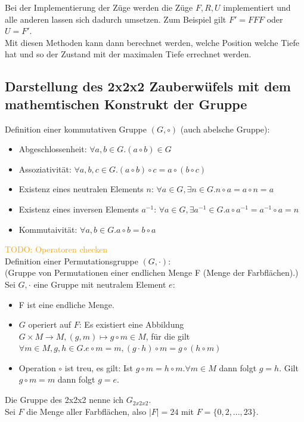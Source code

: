 \documentclass[12pt,a4paper, usenames, dvipsnames]{scrartcl}
\begin{document}
Bei der Implementierung der Züge werden die Züge $F, R, U$ implementiert und alle anderen lassen sich dadurch umsetzen. Zum Beispiel gilt $F' = FFF$ oder $U=F'$. \\
Mit diesen Methoden kann dann berechnet werden, welche Position welche Tiefe hat und so der Zustand mit der maximalen Tiefe errechnet werden.


\newpage 
\subsection*{Darstellung des 2x2x2 Zauberwüfels mit dem mathemtischen Konstrukt der Gruppe}
Definition einer kommutativen Gruppe $(G, \circ)$ (auch abelsche Gruppe):
\begin{itemize}
\item Abgeschlossenheit: $\forall a,b \in G.(a \circ b) \in G $
\item Assoziativität: $\forall a,b,c \in G.(a \circ b) \circ c = a \circ (b \circ c)$
\item Existenz eines neutralen Elements $n$: $\forall a \in G, \exists n \in G.n \circ a = a \circ n = a$ 
\item Existenz eines inversen Elements $a^{-1}$: $\forall a \in G, \exists a^{-1} \in G. a \circ a^{-1} = a^{-1} \circ a = n$ 
\item Kommutaivität: $\forall a,b \in G.a \circ b = b \circ a$
\end{itemize}
\textcolor{orange}{TODO: Operatoren checken} \\
Definition einer Permutationsgruppe $(G, \cdot)$: \\
(Gruppe von Permutationen einer endlichen Menge F (Menge der Farbflächen).)\\
Sei $G, \cdot$ eine Gruppe mit neutralem Element $e$:
\begin{itemize}
\item F ist eine endliche Menge.
\item $G$ operiert auf $F$: Es existiert eine Abbildung $G \times M \rightarrow M, (g,m) \mapsto g \circ m \in M$, für die gilt $\forall m \in M, g,h \in G.e \circ m =m, (g \cdot h) \circ m = g \circ (h \circ m)$
\item Operation $\circ$ ist treu, es gilt: Ist $g \circ m = h \circ m.\forall m \in M$ dann folgt $g=h$. Gilt $g \circ m = m$ dann folgt $g = e$.
\end{itemize}
Die Gruppe des 2x2x2 nenne ich $G_{2x2x2}$. \\
Sei $F$ die Menge aller Farbflächen, also $|F|=24$ mit $F = \lbrace 0, 2, ..., 23\rbrace$.
\end{document}
